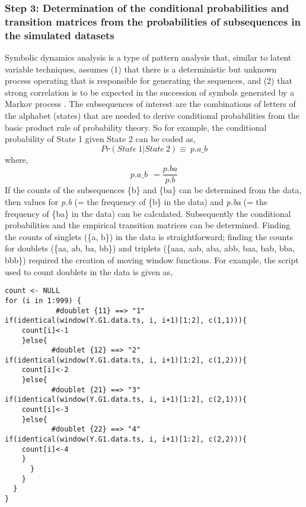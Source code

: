 \documentclass[letter,11pt]{article}
\begin{document}
\subsubsection{Step 3: Determination of the conditional probabilities and transition matrices from the probabilities of subsequences in the simulated datasets}
Symbolic dynamics analysis is a type of pattern analysis that, similar to latent variable techniques, assumes (1) that there is a deterministic but unknown process operating that is responsible for generating the sequences, and (2) that strong correlation is to be expected in the succession of symbols generated by a Markov process \cite{nicolis_exploring_1989}. The subsequences of interest are the combinations of letters of the alphabet (states) that are needed to derive conditional probabilities from the basic product rule of probability theory. So for example, the conditional probability of State 1 given State 2 can be coded as,
\[ Pr(State \ 1|State \ 2) \equiv \ p.a\_b\] 
where,
\[  p.a\_b\ \ = \frac{p.ba}{p.b} \]
If the counts of the subsequences \{b\} and \{ba\} can be determined from the data, then values for \textit{p.b} (= the frequency of \{b\} in the data) and \textit{p.ba} (= the frequency of \{ba\} in the data) can be calculated. Subsequently the conditional probabilities and the empirical transition matrices can be determined. Finding the counts of singlets (\{a, b\}) in the data is straightforward; finding the counts for doublets (\{aa, ab, ba, bb\}) and triplets (\{aaa, aab, aba, abb, baa, bab, bba, bbb\}) required the creation of moving window functions. For example, the script used to count doublets in the data is given as,
\begin{verbatim}
count <- NULL
for (i in 1:999) {
            #doublet {11} ==> "1"
if(identical(window(Y.G1.data.ts, i, i+1)[1:2], c(1,1))){
	count[i]<-1
	}else{
           #doublet {12} ==> "2"
if(identical(window(Y.G1.data.ts, i, i+1)[1:2], c(1,2))){
	count[i]<-2
	}else{
           #doublet {21} ==> "3"	
if(identical(window(Y.G1.data.ts, i, i+1)[1:2], c(2,1))){
	count[i]<-3
	}else{
           #doublet {22} ==> "4"
if(identical(window(Y.G1.data.ts, i, i+1)[1:2], c(2,2))){
	count[i]<-4
	}
      }
    }
  }
}
\end{verbatim}
\end{document}
